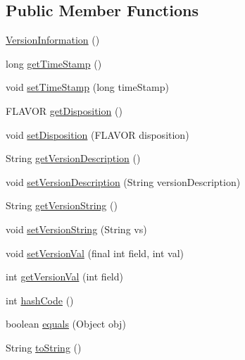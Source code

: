 \subsection*{Public Member Functions}
\begin{DoxyCompactItemize}
\item 
\hyperlink{classgov_1_1fnal_1_1ppd_1_1dd_1_1util_1_1version_1_1VersionInformation_af4471912cacd2bbb1ff3eecc148b824e}{Version\-Information} ()
\item 
long \hyperlink{classgov_1_1fnal_1_1ppd_1_1dd_1_1util_1_1version_1_1VersionInformation_ae9f86a54a3298654a55c8c1e771bce6a}{get\-Time\-Stamp} ()
\item 
void \hyperlink{classgov_1_1fnal_1_1ppd_1_1dd_1_1util_1_1version_1_1VersionInformation_a5564d38346f3a936840c82318e1cdc2e}{set\-Time\-Stamp} (long time\-Stamp)
\item 
F\-L\-A\-V\-O\-R \hyperlink{classgov_1_1fnal_1_1ppd_1_1dd_1_1util_1_1version_1_1VersionInformation_aec69aa2f69f6df902fb9da5e45b9a146}{get\-Disposition} ()
\item 
void \hyperlink{classgov_1_1fnal_1_1ppd_1_1dd_1_1util_1_1version_1_1VersionInformation_a1e3cec92f0dbdd71120e000e6787750e}{set\-Disposition} (F\-L\-A\-V\-O\-R disposition)
\item 
String \hyperlink{classgov_1_1fnal_1_1ppd_1_1dd_1_1util_1_1version_1_1VersionInformation_ac549f15230289e67d0aa6346265bd0f3}{get\-Version\-Description} ()
\item 
void \hyperlink{classgov_1_1fnal_1_1ppd_1_1dd_1_1util_1_1version_1_1VersionInformation_aa2815f5f73561ad56a803674fa70c87b}{set\-Version\-Description} (String version\-Description)
\item 
String \hyperlink{classgov_1_1fnal_1_1ppd_1_1dd_1_1util_1_1version_1_1VersionInformation_a2f986225367b6c4b22085cd2e193af86}{get\-Version\-String} ()
\item 
void \hyperlink{classgov_1_1fnal_1_1ppd_1_1dd_1_1util_1_1version_1_1VersionInformation_a989971bf610d2063f265417fbd65c6ed}{set\-Version\-String} (String vs)
\item 
void \hyperlink{classgov_1_1fnal_1_1ppd_1_1dd_1_1util_1_1version_1_1VersionInformation_a6481bf957491a248df4420de2e0dbf94}{set\-Version\-Val} (final int field, int val)
\item 
int \hyperlink{classgov_1_1fnal_1_1ppd_1_1dd_1_1util_1_1version_1_1VersionInformation_adfcdb07f96bb338c4362c059a4876f0e}{get\-Version\-Val} (int field)
\item 
int \hyperlink{classgov_1_1fnal_1_1ppd_1_1dd_1_1util_1_1version_1_1VersionInformation_a8c0fa24131825cf91b4af5a31054668b}{hash\-Code} ()
\item 
boolean \hyperlink{classgov_1_1fnal_1_1ppd_1_1dd_1_1util_1_1version_1_1VersionInformation_a2e640db116e069eabbc9f16b98678ca4}{equals} (Object obj)
\item 
String \hyperlink{classgov_1_1fnal_1_1ppd_1_1dd_1_1util_1_1version_1_1VersionInformation_ae6b3fbd1f3fd907536651c2a7d8160f0}{to\-String} ()
\end{DoxyCompactItemize}
